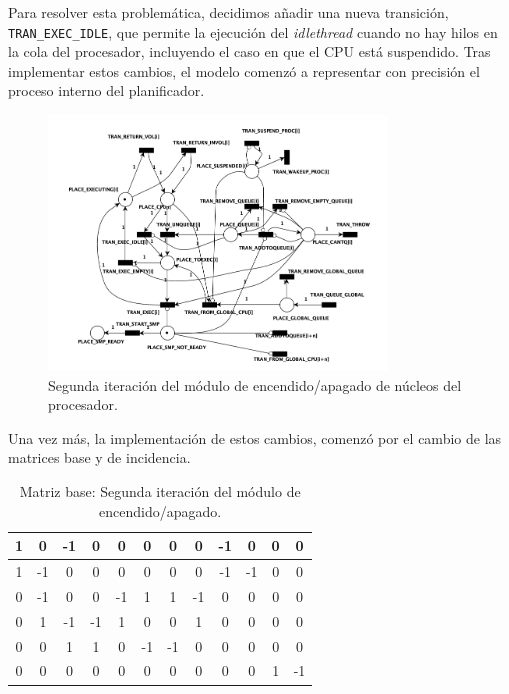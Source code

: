 Para resolver esta problemática, decidimos añadir una nueva transición, \texttt{TRAN\_EXEC\_IDLE}, que permite la ejecución del \textit{idlethread} cuando no hay hilos en la cola del procesador, incluyendo el caso en que el CPU está suspendido. Tras implementar estos cambios, el modelo comenzó a representar con precisión el proceso interno del planificador.\par

\begin{figure}[H]
    \centering
    \vspace*{0.1in}
    \includegraphics[width=0.8\textwidth]{./images/cpuOnOff-2nd-iteration.png}
    \caption{Segunda iteración del módulo de encendido/apagado de núcleos del procesador.}
    \label{fig:queueing-structure}
\end{figure}

Una vez más, la implementación de estos cambios, comenzó por el cambio de las matrices base y de incidencia.

\begin{table}[H]
    \centering
    \begin{tabular}{|c|c|c|c|c|c|c|c|c|c|c|c|}
        \hline
        1 &  0 & -1 &  0 & \cellcolor{lightgray}0 & 0 & 0 & 0 & -1 & 0 & 0 & 0 \\
        \hline
        1 & -1 &  0 &  0 & \cellcolor{lightgray}0 & 0 & 0 & 0 & -1 & -1 & 0 & 0 \\
        \hline
        0 & -1 &  0 &  0 & \cellcolor{lightgray}-1 & 1 & 1 & -1 & 0 & 0 & 0 & 0 \\
        \hline
        0 &  1 & -1 & -1 & \cellcolor{lightgray}1 & 0 & 0 & 1 & 0 & 0 & 0 & 0 \\
        \hline
        0 &  0 &  1 &  1 & \cellcolor{lightgray}0 & -1 & -1 & 0 & 0 & 0 & 0 & 0 \\
        \hline
        0 &  0 &  0 &  0 & \cellcolor{lightgray}0 & 0 & 0 & 0 & 0 & 0 & 1 & -1 \\
        \hline
    \end{tabular}
    \caption{Matriz base: Segunda iteración del módulo de encendido/apagado.}
    \label{tabla:matriz_base_post_2}
\end{table}

